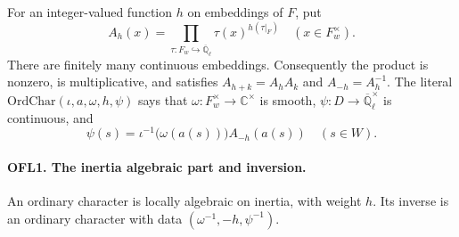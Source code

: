 For an integer-valued function \(h\) on embeddings of \(F\), put
\[
 A_h(x)=\prod_{\tau:F_w\hookrightarrow\overline{\mathbb Q}_\ell}
       \tau(x)^{h(\tau|_F)}\quad(x\in F_w^\times).
 \tag{OFL.2}
\]
There are finitely many continuous embeddings.  Consequently the
product is nonzero, is multiplicative, and satisfies
\(A_{h+k}=A_hA_k\) and \(A_{-h}=A_h^{-1}\).
The literal \(\mathrm{OrdChar}(\iota,a,\omega,h,\psi)\)
says that \(\omega:F_w^\times\to\mathbb C^\times\) is smooth,
\(\psi:D\to\overline{\mathbb Q}_\ell^\times\) is continuous, and
\[
       \psi(s)=\iota^{-1}\bigl(\omega(a(s))\bigr)A_{-h}(a(s))
                         \quad(s\in W).
 \tag{OFL.3}
\]

\paragraph{OFL1. The inertia algebraic part and inversion.}
\label{claim:OFL1}
An ordinary character is locally algebraic on inertia, with weight
\(h\).  Its inverse is an ordinary character with data
\((\omega^{-1},-h,\psi^{-1})\).
